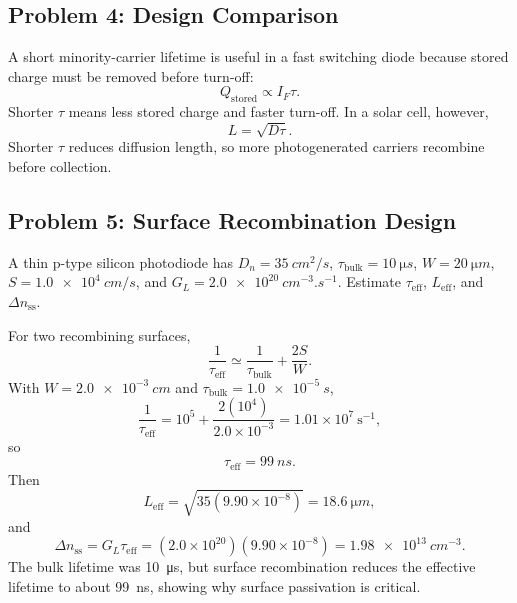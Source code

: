 \documentclass[11pt,a4paper]{article}
\newcommand{\dd}{\Delta}
\begin{document}
\subsection{Problem 4: Design Comparison}

A short minority-carrier lifetime is useful in a fast switching diode because stored charge must be removed before turn-off:
\begin{equation}
  Q_{\mathrm{stored}}\propto I_F\tau .
\end{equation}
Shorter \(\tau\) means less stored charge and faster turn-off. In a solar cell, however,
\begin{equation}
  L=\sqrt{D\tau}.
\end{equation}
Shorter \(\tau\) reduces diffusion length, so more photogenerated carriers recombine before collection.

\subsection{Problem 5: Surface Recombination Design}

\begin{tcolorbox}[title={Question}]
A thin p-type silicon photodiode has \(D_n=\SI{35}{cm^2/s}\), \(\tau_{\mathrm{bulk}}=\SI{10}{\micro s}\), \(W=\SI{20}{\micro m}\), \(S=\SI{1.0e4}{cm/s}\), and \(G_L=\SI{2.0e20}{cm^{-3}.s^{-1}}\). Estimate \(\tau_{\mathrm{eff}}\), \(L_{\mathrm{eff}}\), and \(\dd n_{\mathrm{ss}}\).
\end{tcolorbox}

For two recombining surfaces,
\begin{equation}
  \frac{1}{\tau_{\mathrm{eff}}}\simeq
  \frac{1}{\tau_{\mathrm{bulk}}}+\frac{2S}{W}.
\end{equation}
With \(W=\SI{2.0e-3}{cm}\) and \(\tau_{\mathrm{bulk}}=\SI{1.0e-5}{s}\),
\begin{equation}
  \frac{1}{\tau_{\mathrm{eff}}}
  =10^5+\frac{2(10^4)}{2.0\times10^{-3}}
  =1.01\times10^7\ \mathrm{s^{-1}},
\end{equation}
so
\begin{equation}
  \tau_{\mathrm{eff}}=\SI{99}{ns}.
\end{equation}
Then
\begin{equation}
  L_{\mathrm{eff}}=\sqrt{35(9.90\times10^{-8})}
  =\SI{18.6}{\micro m},
\end{equation}
and
\begin{equation}
  \dd n_{\mathrm{ss}}=G_L\tau_{\mathrm{eff}}
  =(2.0\times10^{20})(9.90\times10^{-8})
  =\SI{1.98e13}{cm^{-3}}.
\end{equation}
The bulk lifetime was \SI{10}{\micro s}, but surface recombination reduces the effective lifetime to about \SI{99}{ns}, showing why surface passivation is critical.
\end{document}
